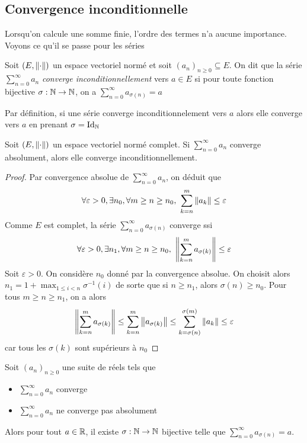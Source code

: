 \subsection*{Convergence inconditionnelle}
Lorsqu'on calcule une somme finie, l'ordre des termes n'a aucune importance. Voyons ce qu'il se passe pour les séries
\begin{definition}
    Soit $(E,\left\| \cdot \right\|)$ un espace vectoriel normé et soit $(a_n)_{n\ge0}\subseteq E$. On dit que la série $\sum_{n = 0}^\infty a_n$ \emph{converge inconditionnellement} vers $a\in E$ si pour toute fonction bijective $\sigma : \mathbb{N}\to\mathbb{N}$, on a $\sum_{n = 0}^\infty a_{\sigma (n)} = a$
\end{definition}
\begin{remarque}
    Par définition, si une série converge inconditionnelement vers $a$ alors elle converge vers $a$ en prenant $\sigma = \mathrm{Id}_{\mathbb{N}}$
\end{remarque}
\begin{proposition}
    Soit $(E,\left\| \cdot \right\|)$ un espace vectoriel normé complet. Si $\sum_{n = 0}^\infty a_n$ converge absolument, alors elle converge inconditionnellement.
\end{proposition}
\begin{proof}
    Par convergence absolue de $\sum_{n=0}^\infty a_n$, on déduit que $$\forall \varepsilon >0,\exists n_0,\forall m\ge n\ge n_0,\ \sum_{k = n}^m\left\| a_k \right\|\le \varepsilon$$
    Comme $E$ est complet, la série $\sum_{n=0}^\infty a_{\sigma(n)}$ converge ssi $$\forall \varepsilon >0,\exists n_1,\forall m\ge n\ge n_0,\ \left\| \sum_{k = n}^ma_{\sigma(k)} \right\|\le \varepsilon$$
    Soit $\varepsilon>0$. On considère $n_0$ donné par la convergence absolue. On choisit alors $n_1 = 1+\max_{1\le i<n} \sigma^{-1}(i)$ de sorte que si $n\ge n_1$, alors $\sigma(n)\ge n_0$. Pour tous $m\ge n \ge n_1$, on a alors $$\left\| \sum_{k =n}^ma_{\sigma(k)} \right\|\le \sum_{k =n}^m\left\| a_{\sigma(k)} \right\|\le \sum_{k =\sigma (n)}^{\sigma (m)}\left\| a_{k} \right\|\le  \varepsilon$$ car tous les $\sigma(k)$ sont supérieurs à $n_0$
\end{proof}
\begin{theoreme}
    Soit $(a_n)_{n\ge0}$ une suite de réels tels que \begin{itemize}
        \item $\sum_{n=0}^\infty a_n$ converge
        \item $\sum_{n=0}^\infty a_n$ ne converge pas absolument
    \end{itemize}
    Alors pour tout $a\in\mathbb{R}$, il existe $\sigma : \mathbb{N}\to\mathbb{N}$ bijective telle que $\sum_{n=0}^\infty a_{\sigma (n)} = a$.
\end{theoreme}
